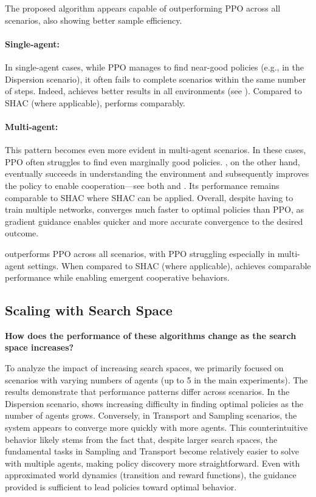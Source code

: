 The proposed algorithm appears capable of outperforming PPO across all scenarios, also showing better sample efficiency.

\noindent\paragraph{Single-agent:} In single-agent cases, while PPO manages to find near-good policies (e.g., in the Dispersion scenario), it often fails to complete scenarios within the same number of steps. Indeed, \fname{} achieves better results in all environments (see ). Compared to SHAC (where applicable), \fname{} performs comparably.

\noindent\paragraph{Multi-agent:} This pattern becomes even more evident in multi-agent scenarios. In these cases, PPO often struggles to find even marginally good policies. \fname{}, on the other hand, eventually succeeds in understanding the environment and subsequently improves the policy to enable cooperation---see both  and . Its performance remains comparable to SHAC where SHAC can be applied.
Overall, despite having to train multiple networks, \fname{} converges much faster to optimal policies than PPO, as gradient guidance enables quicker and more accurate convergence to the desired outcome.

\begin{replybox}
\fname{} outperforms PPO across all scenarios, with PPO struggling especially in multi-agent settings. When compared to SHAC (where applicable), \fname{} achieves comparable performance while enabling emergent cooperative behaviors.
\end{replybox}

\subsection{Scaling with Search Space}
\begin{rqbox}
\textbf{How does the performance of these algorithms change as the search space increases?}
\end{rqbox}

To analyze the impact of increasing search spaces, we primarily focused on scenarios with varying numbers of agents (up to 5 in the main experiments). The results demonstrate that performance patterns differ across scenarios. In the Dispersion scenario, \fname{} shows increasing difficulty in finding optimal policies as the number of agents grows. Conversely, in Transport and Sampling scenarios, the system appears to converge more quickly with more agents. This counterintuitive behavior likely stems from the fact that, despite larger search spaces, the fundamental tasks in Sampling and Transport become relatively easier to solve with multiple agents, making policy discovery more straightforward. Even with approximated world dynamics (transition and reward functions), the guidance provided is sufficient to lead policies toward optimal behavior.

